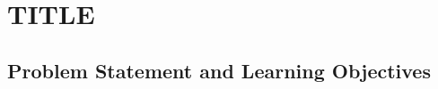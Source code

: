 %
%
%

\chapter{TITLE}

\section{Problem Statement and Learning Objectives}


\section{}
\section{}
\section{}
\section{}
\section{}
\section{}
\section{}
\section{}
\section{}



